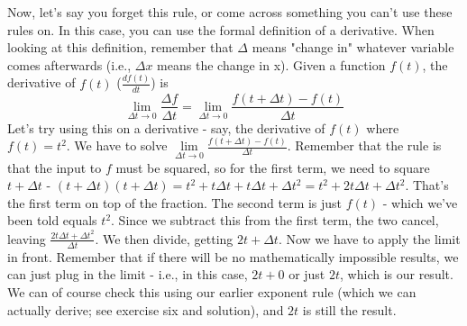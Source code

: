 Now, let's say you forget this rule, or come across something you can't use these rules on. In this case, you can use the formal definition of a derivative. When looking at this definition, remember that $\Delta$ means "change in" whatever variable comes afterwards (i.e., $\Delta x$ means the change in x). Given a function $f(t)$, the derivative of $f(t)$ ($\frac{df(t)}{dt}$) is \begin{equation}
    \lim\limits_{\Delta t\rightarrow 0}\frac{\Delta f}{\Delta t} = \lim\limits_{\Delta t\rightarrow 0}\frac{f(t+\Delta t)-f(t)}{\Delta t}
\end{equation}
Let's try using this on a derivative - say, the derivative of $f(t)$ where $f(t) = t^2$. We have to solve $\lim\limits_{\Delta t\rightarrow 0}\frac{f(t+\Delta t)-f(t)}{\Delta t}$. Remember that the rule is that the input to $f$ must be squared, so for the first term, we need to square $t+\Delta t$ - $(t+\Delta t)(t+\Delta t) = t^2+t\Delta t+t\Delta t + \Delta t^2 = t^2+2t\Delta t+\Delta t^2$. That's the first term on top of the fraction. The second term is just $f(t)$ - which we've been told equals $t^2$. Since we subtract this from the first term, the two cancel, leaving $\frac{2t\Delta t+\Delta t^2}{\Delta t}$. We then divide, getting $2t+\Delta t$. Now we have to apply the limit in front. Remember that if there will be no mathematically impossible results, we can just plug in the limit - i.e., in this case, $2t+0$ or just $2t$, which is our result. We can of course check this using our earlier exponent rule (which we can actually derive; see exercise six and solution), and $2t$ is still the result.
